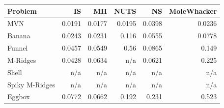 \begin{tabular}{lrrrrr}
\toprule
Problem & IS & MH & NUTS & NS & MoleWhacker \\
\midrule
MVN & 0.0191 & 0.0177 & 0.0195 & 0.0398 & 0.0236 \\
Banana & 0.0243 & 0.0231 & 0.116 & 0.0555 & 0.0778 \\
Funnel & 0.0457 & 0.0549 & 0.56 & 0.0865 & 0.149 \\
M-Ridges & 0.0428 & 0.0634 & n/a & 0.0621 & 0.225 \\
Shell & n/a & n/a & n/a & n/a & n/a \\
Spiky M-Ridges & n/a & n/a & n/a & n/a & n/a \\
\midrule
Eggbox & 0.0772 & 0.0662 & 0.192 & 0.231 & 0.523 \\
\bottomrule
\end{tabular}
